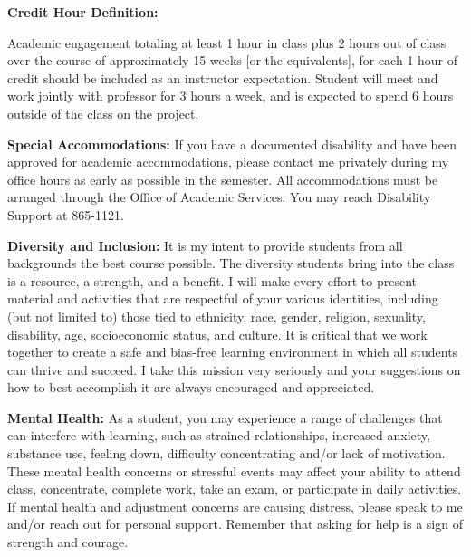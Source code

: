 \documentclass[12pt]{article}
\begin{document}
\medskip\medskip

\noindent\textbf{Credit Hour Definition:} 

Academic engagement totaling at least 1 hour in class plus 2 hours out of class over the course of approximately 15 weeks [or the equivalents], for each 1 hour of credit should be included as an instructor expectation. Student will meet and work jointly with professor for 3 hours a week, and is expected to spend 6 hours outside of the class on the project.

\vspace{.15in}

{\bf \noindent Special Accommodations:}  If you have a documented disability and have been approved for academic accommodations, please contact me privately during my office hours as early as possible in the semester. All accommodations must be arranged through the Office of Academic Services. You may reach Disability Support at 865-1121.

\medskip\medskip

{\bf \noindent Diversity and Inclusion:} It is my intent to provide students from all backgrounds the best course possible. The diversity students bring into the class is a resource, a strength, and a benefit. I will make every effort to present material and activities that are respectful of your various identities, including (but not limited to) those tied to ethnicity, race, gender, religion, sexuality, disability, age, socioeconomic status, and culture. It is critical that we work together to create a safe and bias-free learning environment in which all students can thrive and succeed. I take this mission very seriously and your suggestions on how to best accomplish it are always encouraged and appreciated.

\medskip\medskip

{\bf \noindent Mental Health:} As a student, you may experience a range of challenges that can interfere with learning, such as strained relationships, increased anxiety, substance use, feeling down, difficulty concentrating and/or lack of motivation. These mental health concerns or stressful events may affect your ability to attend class, concentrate, complete work, take an exam, or participate in daily activities. If mental health and adjustment concerns are causing distress, please speak to me and/or reach out for personal support. Remember that asking for help is a sign of strength and courage.

\medskip
\end{document}
